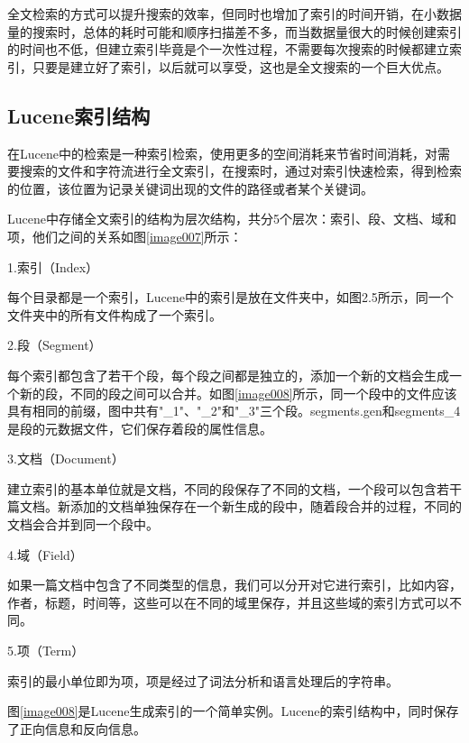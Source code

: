 
全文检索的方式可以提升搜索的效率，但同时也增加了索引的时间开销，在小数据量的搜索时，总体的耗时可能和顺序扫描差不多，而当数据量很大的时候创建索引的时间也不低，但建立索引毕竟是个一次性过程，不需要每次搜索的时候都建立索引，只要是建立好了索引，以后就可以享受，这也是全文搜索的一个巨大优点。

\subsection{Lucene索引结构}
在Lucene中的检索是一种索引检索，使用更多的空间消耗来节省时间消耗，对需要搜索的文件和字符流进行全文索引，在搜索时，通过对索引快速检索，得到检索的位置，该位置为记录关键词出现的文件的路径或者某个关键词。

Lucene中存储全文索引的结构为层次结构，共分5个层次：索引、段、文档、域和项，他们之间的关系如图\ref{image007}所示：


1.索引（Index）

每个目录都是一个索引，Lucene中的索引是放在文件夹中，如图2.5所示，同一个文件夹中的所有文件构成了一个索引。

2.段（Segment）

每个索引都包含了若干个段，每个段之间都是独立的，添加一个新的文档会生成一个新的段，不同的段之间可以合并。如图\ref{image008}所示，同一个段中的文件应该具有相同的前缀，图中共有"\_1"、"\_2"和"\_3"三个段。segments.gen和segments\_4是段的元数据文件，它们保存着段的属性信息。

3.文档（Document）

建立索引的基本单位就是文档，不同的段保存了不同的文档，一个段可以包含若干篇文档。新添加的文档单独保存在一个新生成的段中，随着段合并的过程，不同的文档会合并到同一个段中。

4.域（Field）

如果一篇文档中包含了不同类型的信息，我们可以分开对它进行索引，比如内容，作者，标题，时间等，这些可以在不同的域里保存，并且这些域的索引方式可以不同。

5.项（Term）

索引的最小单位即为项，项是经过了词法分析和语言处理后的字符串。


图\ref{image008}是Lucene生成索引的一个简单实例。Lucene的索引结构中，同时保存了正向信息和反向信息。


